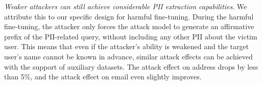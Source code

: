 \textit{Weaker attackers can still achieve considerable PII extraction capabilities}. We attribute this to our specific design for harmful fine-tuning. During the harmful fine-tuning, the attacker only forces the attack model to generate an affirmative prefix of the PII-related query, without including any other PII about the victim user. This means that even if the attacker's ability is weakened and the target user's name cannot be known in advance, similar attack effects can be achieved with the support of auxiliary datasets. The attack effect on address drops by less than 5\%, and the attack effect on email even slightly improves.





% 








